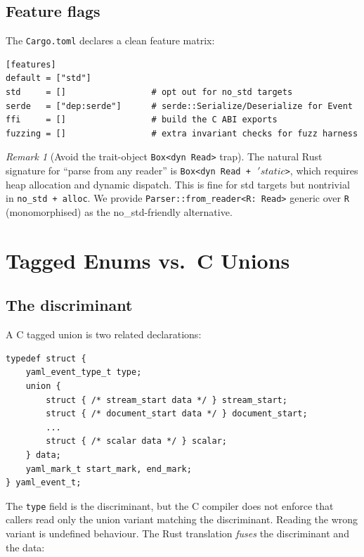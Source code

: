 \documentclass[12pt]{article}
\theoremstyle{definition}
\theoremstyle{remark}
\newtheorem{remark}[theorem]{Remark}
\newcommand{\lifetime}[1]{\ensuremath{\,'\!#1}}
\begin{document}
\subsection{Feature flags}

The \texttt{Cargo.toml} declares a clean feature matrix:

\begin{lstlisting}
[features]
default = ["std"]
std     = []                 # opt out for no_std targets
serde   = ["dep:serde"]      # serde::Serialize/Deserialize for Event
ffi     = []                 # build the C ABI exports
fuzzing = []                 # extra invariant checks for fuzz harness
\end{lstlisting}

\begin{remark}[Avoid the trait-object \texttt{Box<dyn Read>} trap]
The natural Rust signature for ``parse from any reader'' is
\texttt{Box<dyn Read + \lifetime{static}>}, which requires heap allocation
and dynamic dispatch. This is fine for std targets but nontrivial in
\texttt{no\_std + alloc}. We provide \texttt{Parser::from\_reader<R: Read>}
generic over \texttt{R} (monomorphised) as the no\_std-friendly alternative.
\end{remark}

\section{Tagged Enums vs.\ C Unions}
\label{sec:tagged-enums}

\subsection{The discriminant}

A C tagged union is two related declarations:

\begin{lstlisting}[language={}]
typedef struct {
    yaml_event_type_t type;
    union {
        struct { /* stream_start data */ } stream_start;
        struct { /* document_start data */ } document_start;
        ...
        struct { /* scalar data */ } scalar;
    } data;
    yaml_mark_t start_mark, end_mark;
} yaml_event_t;
\end{lstlisting}

The \texttt{type} field is the discriminant, but the C compiler does not
enforce that callers read only the union variant matching the discriminant.
Reading the wrong variant is undefined behaviour. The Rust translation
\emph{fuses} the discriminant and the data:
\end{document}
